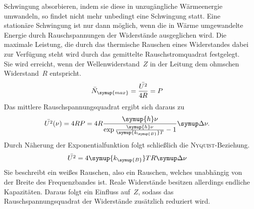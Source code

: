 Schwingung absorbieren, indem sie diese in unzugängliche Wärmeenergie umwandeln,
so findet nicht mehr unbedingt eine Schwingung statt. Eine stationäre Schwingung
ist nur dann möglich, wenn die in Wärme umgewandelte Energie durch
Rauschspannungen der Widerstände ausgeglichen wird. Die maximale Leistung, die
durch das thermische Rauschen eines Widerstandes dabei zur Verfügung steht wird
durch das gemittelte Rauschstromquadrat festgelegt. Sie wird erreicht, wenn der
Wellenwiderstand~$Z$ in der Leitung dem ohmschen Widerstand~$R$ entspricht.
%
\begin{equation}
  \bar{N}_{\symup{max}}=\frac{\bar{U^2}}{4R}=P
\end{equation}
%
Das mittlere Rauschspannungsquadrat ergibt sich daraus zu
%
\begin{equation}
  \bar{U^2}(\nu)=4RP=4R\frac{\symup{h}\nu}{\exp{\frac{\symup{h}\nu}{\symup{k_{\symup{B}}}T}}-1}\upD\nu.
\end{equation}
%
Durch Näherung der Exponentialfunktion folgt schließlich die
\textsc{Nyquist}-Beziehung.
%
\begin{equation}
  \bar{U^2}=4\symup{k_{\symup{B}}}TR\upD\nu
\end{equation}
%
Sie beschreibt ein weißes Rauschen, also ein Rauschen, welches unabhängig von
der Breite des Frequenzbandes ist. Reale Widerstände besitzen allerdings
endliche Kapazitäten. Daraus folgt ein Einfluss auf~$Z$, sodass das
Rauschspannungsquadrat der Widerstände zusätzlich reduziert wird.

